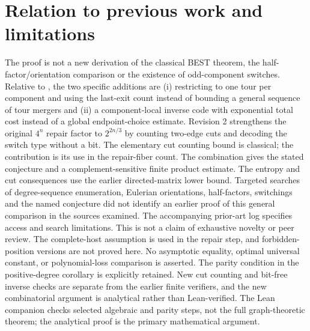 \documentclass[11pt]{article}
\theoremstyle{remark}\newtheorem{remark}[theorem]{Remark}
\begin{document}
\section{Relation to previous work and limitations}
The proof is not a new derivation of the classical BEST theorem, the half-factor/orientation comparison or the existence of odd-component switches. Relative to \cite[Section 9]{mehrdad26}, the two specific additions are (i) restricting to one tour per component and using the last-exit count instead of bounding a general sequence of tour mergers and (ii) a component-local inverse code with exponential total cost instead of a global endpoint-choice estimate. Revision 2 strengthens the original $4^n$ repair factor to $2^{2n/3}$ by counting two-edge cuts and decoding the switch type without a bit. The elementary cut counting bound is classical; the contribution is its use in the repair-fiber count. The combination gives the stated conjecture and a complement-sensitive finite product estimate. The entropy and cut consequences use the earlier directed-matrix lower bound. Targeted searches of degree-sequence enumeration, Eulerian orientations, half-factors, switchings and the named conjecture did not identify an earlier proof of this general comparison in the sources examined. The accompanying prior-art log specifies access and search limitations. This is not a claim of exhaustive novelty or peer review. The complete-host assumption is used in the repair step, and forbidden-position versions are not proved here. No asymptotic equality, optimal universal constant, or polynomial-loss comparison is asserted. The parity condition in the positive-degree corollary is explicitly retained. New cut counting and bit-free inverse checks are separate from the earlier finite verifiers, and the new combinatorial argument is analytical rather than Lean-verified. The Lean companion checks selected algebraic and parity steps, not the full graph-theoretic theorem; the analytical proof is the primary mathematical argument.
\end{document}

